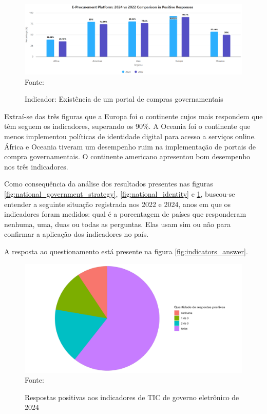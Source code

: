 \begin{figure}[H]
	\centering
	\caption{Indicador: Existência de um portal de compras governamentais}
	\includegraphics[width=1\linewidth]{figuras/ict_in_government/procurement_portal}
	\label{fig:procurement_portal}
	\footnotesize{Fonte: \cite{ONU_ICT_in_government_indicators}}
\end{figure}

Extraí-se das três figuras que a Europa foi o continente cujos mais respondem que têm seguem os indicadores, superando os 90\%. A Oceania foi o continente que menos implementou políticas de identidade digital para acesso a serviços online. África e Oceania tiveram um desempenho ruim na implementação de portais de compra governamentais. O continente americano apresentou bom desempenho nos três indicadores.

Como consequência da análise dos resultados presentes nas figuras \ref{fig:national_government_strategy}, \ref{fig:national_identity} e \ref{fig:procurement_portal}, buscou-se entender a seguinte situação registrada nos 2022 e 2024, anos em que os indicadores foram medidos: qual é a porcentagem de países que responderam nenhuma, uma, duas ou todas as perguntas. Elas usam sim ou não para confirmar a aplicação dos indicadores no país.

A resposta ao questionamento está presente na figura \ref{fig:indicators_answer}.

\begin{figure}[H]
	\centering
	\caption{Respostas positivas aos indicadores de TIC de governo eletrônico de 2024}
	\includegraphics[width=1\linewidth]{figuras/ticegov_soma_respostas_positivas}
	\label{fig:ticegov_soma_respostas_positivas}
	\footnotesize{Fonte: \cite{ONU_ICT_in_government_indicators}}
\end{figure}

